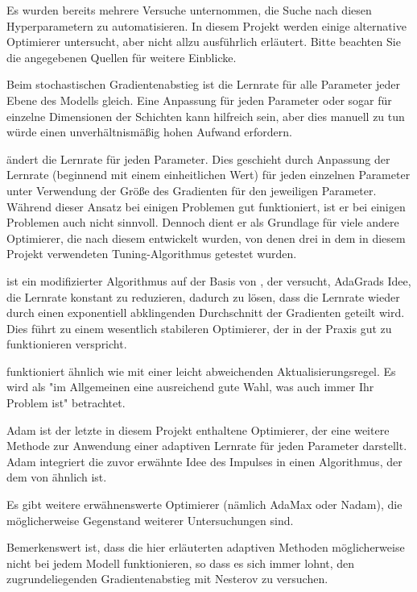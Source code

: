 Es wurden bereits mehrere Versuche unternommen, die Suche nach diesen Hyperparametern zu automatisieren.
In diesem Projekt werden einige alternative Optimierer untersucht, aber nicht allzu ausführlich erläutert.
Bitte beachten Sie die angegebenen Quellen für weitere Einblicke.

Beim stochastischen Gradientenabstieg ist die Lernrate für alle Parameter jeder Ebene des Modells gleich.
Eine Anpassung für jeden Parameter oder sogar für einzelne Dimensionen der Schichten kann hilfreich sein, aber dies manuell zu tun würde einen unverhältnismäßig hohen Aufwand erfordern.

 \cite{Duchi2010} ändert die Lernrate für jeden Parameter.
Dies geschieht durch Anpassung der Lernrate (beginnend mit einem einheitlichen Wert) für jeden einzelnen Parameter unter Verwendung der Größe des Gradienten für den jeweiligen Parameter.
Während dieser Ansatz bei einigen Problemen gut funktioniert, ist er bei einigen Problemen auch nicht sinnvoll.
Dennoch dient er als Grundlage für viele andere Optimierer, die nach diesem entwickelt wurden, von denen drei in dem in diesem Projekt verwendeten Tuning-Algorithmus getestet wurden.

 \cite{Zeiler2012} ist ein modifizierter Algorithmus auf der Basis von , der versucht, AdaGrads Idee, die Lernrate konstant zu reduzieren, dadurch zu lösen, dass die Lernrate wieder durch einen exponentiell abklingenden Durchschnitt der Gradienten geteilt wird.
Dies führt zu einem wesentlich stabileren Optimierer, der in der Praxis gut zu funktionieren verspricht.

 \cite{Hinton2012} funktioniert ähnlich wie  mit einer leicht abweichenden Aktualisierungsregel.
Es wird als "im Allgemeinen eine ausreichend gute Wahl, was auch immer Ihr Problem ist" \cite[S.77]{Chollet2017} betrachtet.

Adam \cite{Kingma2014}\cite{Reddi2018} ist der letzte in diesem Projekt enthaltene Optimierer, der eine weitere Methode zur Anwendung einer adaptiven Lernrate für jeden Parameter darstellt.
Adam integriert die zuvor erwähnte Idee des Impulses in einen Algorithmus, der dem von  ähnlich ist.

Es gibt weitere erwähnenswerte Optimierer (nämlich AdaMax oder Nadam), die möglicherweise Gegenstand weiterer Untersuchungen sind.

Bemerkenswert ist, dass die hier erläuterten adaptiven Methoden möglicherweise nicht bei jedem Modell funktionieren, so dass es sich immer lohnt, den zugrundeliegenden Gradientenabstieg mit Nesterov\cite[S.358]{Geron2019} zu versuchen.

